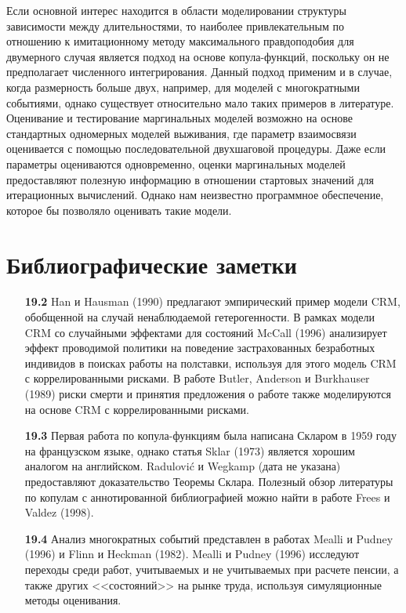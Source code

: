 Если основной интерес находится в области моделировании структуры зависимости между длительностями, то наиболее привлекательным по отношению к имитационному методу максимального правдоподобия для двумерного случая является подход на основе копула-функций, поскольку он не предполагает численного интегрирования. Данный подход применим и в случае, когда размерность больше двух, например, для моделей с многократными событиями, однако существует относительно мало таких примеров в литературе. Оценивание и тестирование маргинальных моделей возможно на основе стандартных одномерных моделей выживания, где параметр взаимосвязи оценивается с помощью последовательной двухшаговой процедуры. Даже если параметры оцениваются одновременно, оценки маргинальных моделей предоставляют полезную информацию в отношении стартовых значений для итерационных вычислений. Однако нам неизвестно программное обеспечение, которое бы позволяло оценивать такие модели.




\section{Библиографические заметки}\label{sec:19.7}

\begin{itemize}

    \item[\textbf{19.2}]
Han и Hausman (1990) предлагают эмпирический пример модели CRM, обобщенной на случай ненаблюдаемой гетерогенности.
В рамках модели CRM со случайными эффектами для состояний McCall (1996) анализирует эффект проводимой политики на поведение застрахованных безработных индивидов в поисках работы на полставки, используя для этого модель CRM с коррелированными рисками. В работе Butler, Anderson и Burkhauser (1989) риски смерти и принятия предложения о работе также моделируются на основе CRM с коррелированными рисками.

    \item[\textbf{19.3}]
Первая работа по копула-функциям была написана Скларом в 1959 году на французском языке, однако статья Sklar (1973) является хорошим аналогом на английском. Radulovi\'c и Wegkamp (дата не указана) предоставляют доказательство Теоремы Склара. Полезный обзор литературы по копулам с аннотированной библиографией можно найти в работе Frees и Valdez (1998).

    \item[\textbf{19.4}]
Анализ многократных событий представлен в работах Mealli и Pudney (1996) и Flinn и Heckman (1982). Mealli и Pudney (1996) исследуют переходы среди работ, учитываемых и не учитываемых при расчете пенсии, а также других <<состояний>> на рынке труда, используя симуляционные методы оценивания.

\end{itemize}



